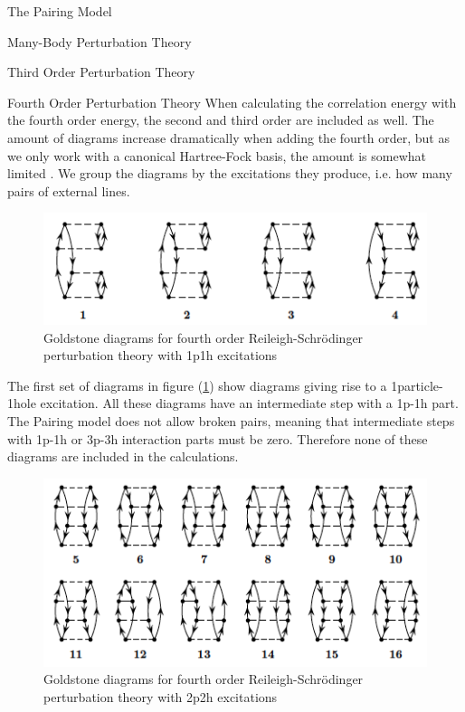 \documentclass[twoside,english]{uiofysmaster}
\begin{document}
\begin{chapter}{The Pairing Model}
\begin{section}{Many-Body Perturbation Theory}
\begin{subsection}{Third Order Perturbation Theory}
		\end{subsection}

		\begin{subsection}{Fourth Order Perturbation Theory}
			When calculating the correlation energy with the fourth order energy, the second and third order are included as well. The amount of diagrams increase dramatically when adding the fourth order, but as we only work with a canonical Hartree-Fock basis, the amount is somewhat limited \cite{ShavittAndBartlett}. We group the diagrams by the excitations they produce, i.e. how many pairs of external lines. 
			\begin{figure}[H]
				\includegraphics[width=\textwidth]{Figures/fourthorder1p1h.png}
				\caption{Goldstone diagrams for fourth order Reileigh-Schr\"{o}dinger perturbation theory with 1p1h excitations}
				\label{figure:mbpt1p1h}
			\end{figure}
			The first set of diagrams in figure (\ref{figure:mbpt1p1h}) show diagrams giving rise to a 1particle-1hole excitation. All these diagrams have an intermediate step with a 1p-1h part. The Pairing model does not allow broken pairs, meaning that intermediate steps with 1p-1h or 3p-3h interaction parts must be zero. Therefore none of these diagrams are included in the calculations.
			\begin{figure}[H]
				\includegraphics[width=\textwidth]{Figures/fourthorder2p2h.png}
				\caption{Goldstone diagrams for fourth order Reileigh-Schr\"{o}dinger perturbation theory with 2p2h excitations}

\end{figure}
\end{subsection}
\end{section}
\end{chapter}
\end{document}
